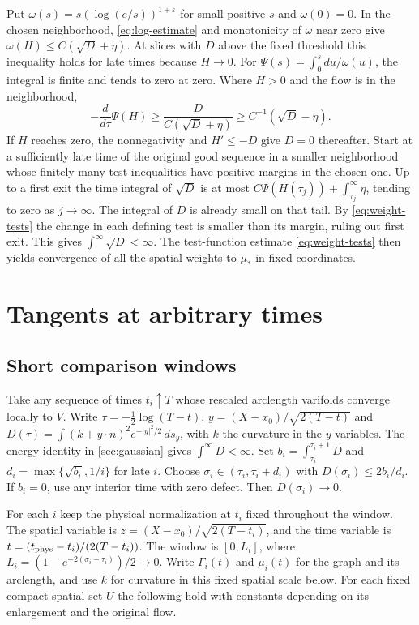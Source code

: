 Put \(\omega(s)=s(\log(e/s))^{1+\varepsilon}\) for small positive \(s\) and \(\omega(0)=0\). In the chosen neighborhood, \eqref{eq:log-estimate} and monotonicity of \(\omega\) near zero give \(\omega(H)\le C(\sqrt D+\eta)\). At slices with \(D\) above the fixed threshold this inequality holds for late times because \(H\to0\). For \(\Psi(s)=\int_0^s du/\omega(u)\), the integral is finite and tends to zero at zero. Where \(H>0\) and the flow is in the neighborhood, \[
 -\frac{d}{d\tau}\Psi(H)
 \ge \frac{D}{C(\sqrt D+\eta)}
 \ge C^{-1}(\sqrt D-\eta).
\] If \(H\) reaches zero, the nonnegativity and \(H'\le-D\) give \(D=0\) thereafter. Start at a sufficiently late time of the original good sequence in a smaller neighborhood whose finitely many test inequalities have positive margins in the chosen one. Up to a first exit the time integral of \(\sqrt D\) is at most \(C\Psi(H(\tau_j))+\int_{\tau_j}^\infty\eta\), tending to zero as \(j\to\infty\). The integral of \(D\) is already small on that tail. By \eqref{eq:weight-tests} the change in each defining test is smaller than its margin, ruling out first exit. This gives \(\int^\infty\sqrt D<\infty\). The test-function estimate \eqref{eq:weight-tests} then yields convergence of all the spatial weights to \(\mu_*\) in fixed coordinates.

\section{Tangents at arbitrary times}\label{sec:tangents}

\subsection{Short comparison windows}\label{sec:windows}

Take any sequence of times \(t_i\uparrow T\) whose rescaled arclength varifolds converge locally to \(V\). Write \(\tau=-\frac12\log(T-t)\), \(y=(X-x_0)/\sqrt{2(T-t)}\) and \(D(\tau)=\int (k+y\cdot n)^2e^{-|y|^2/2}\,ds_y\), with \(k\) the curvature in the \(y\) variables. The energy identity in \cref{sec:gaussian} gives \(\int^\infty D<\infty\). Set \(b_i=\int_{\tau_i}^{\tau_i+1}D\) and \(d_i=\max\{\sqrt{b_i},1/i\}\) for late \(i\). Choose \(\sigma_i\in(\tau_i,\tau_i+d_i)\) with \(D(\sigma_i)\le 2b_i/d_i\). If \(b_i=0\), use any interior time with zero defect. Then \(D(\sigma_i)\to0\).

For each \(i\) keep the physical normalization at \(t_i\) fixed throughout the window. The spatial variable is \(z=(X-x_0)/\sqrt{2(T-t_i)}\), and the time variable is \(t=(t_{\rm phys}-t_i)/(2(T-t_i))\). The window is \([0,L_i]\), where \(L_i=(1-e^{-2(\sigma_i-\tau_i)})/2\to0\). Write \(\Gamma_i(t)\) and \(\mu_i(t)\) for the graph and its arclength, and use \(k\) for curvature in this fixed spatial scale below. For each fixed compact spatial set \(U\) the following hold with constants depending on its enlargement and the original flow.

